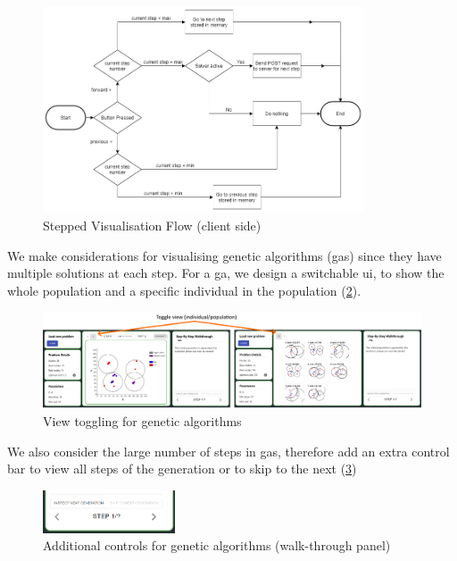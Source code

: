 \begin{figure}[H]
    \centering
    \includegraphics[width=0.85\textwidth]{images/stepped_solver_ui/walkthrough_flow.png}
    \caption{Stepped Visualisation Flow (client side)}
    \label{fig:step_sol_logic}
\end{figure}

We make considerations for visualising genetic algorithms (\acrshort{ga}s) since they have multiple solutions at each step. For a \acrshort{ga}, we design a switchable \acrshort{ui}, to show the whole population and a specific individual in the population (\cref{fig:step_sol_toggle}). 

\begin{figure}[H]
    \centering
    \includegraphics[width=\textwidth]{images/stepped_solver_ui/stepped_solver_toggle.png}
    \caption{View toggling for genetic algorithms}
    \label{fig:step_sol_toggle}
\end{figure}

We also consider the large number of steps in \acrshort{ga}s, therefore add an extra control bar to view all steps of the generation or to skip to the next (\cref{fig:step_sol_skip})

\begin{figure}[H]
    \centering
    \includegraphics[width=0.35\textwidth]{images/stepped_solver_ui/stepped_solver_skip.png}
    \caption{Additional controls for genetic algorithms (walk-through panel)}
    \label{fig:step_sol_skip}
\end{figure}
